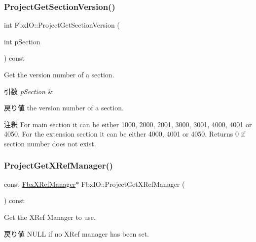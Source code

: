\subsubsection{\texorpdfstring{Project\+Get\+Section\+Version()}{ProjectGetSectionVersion()}}
{\footnotesize\ttfamily int Fbx\+I\+O\+::\+Project\+Get\+Section\+Version (\begin{DoxyParamCaption}\item[{int}]{p\+Section }\end{DoxyParamCaption}) const}

Get the version number of a section. 
\begin{DoxyParams}{引数}
{\em p\+Section} & \\
\hline
\end{DoxyParams}
\begin{DoxyReturn}{戻り値}
the version number of a section. 
\end{DoxyReturn}
\begin{DoxyRemark}{注釈}
For main section it can be either 1000, 2000, 2001, 3000, 3001, 4000, 4001 or 4050. For the extension section it can be either 4000, 4001 or 4050. Returns 0 if section number does not exist. 
\end{DoxyRemark}
\mbox{\label{class_fbx_i_o_a848f9a7d818160eae6e231cd15ea8c9f}} 
\subsubsection{\texorpdfstring{Project\+Get\+X\+Ref\+Manager()}{ProjectGetXRefManager()}}
{\footnotesize\ttfamily const \hyperlink{class_fbx_x_ref_manager}{Fbx\+X\+Ref\+Manager}$\ast$ Fbx\+I\+O\+::\+Project\+Get\+X\+Ref\+Manager (\begin{DoxyParamCaption}{ }\end{DoxyParamCaption}) const}

Get the X\+Ref Manager to use. \begin{DoxyReturn}{戻り値}
N\+U\+LL if no X\+Ref manager has been set. 
\end{DoxyReturn}
\mbox{\label{class_fbx_i_o_a767b2b322e766773191b7065d8499d33}} 
